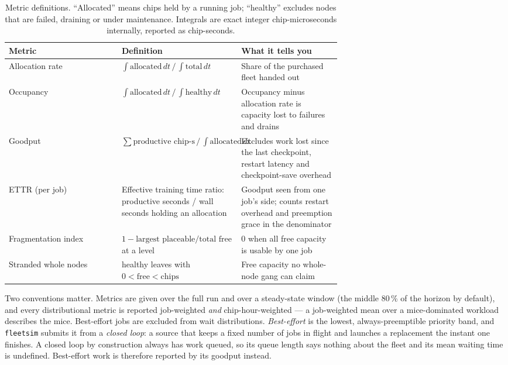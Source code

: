 \begin{table}[t]
\centering
\caption{Metric definitions. ``Allocated'' means chips held by a running job;
``healthy'' excludes nodes that are failed, draining or under maintenance.
Integrals are exact integer chip-microseconds internally, reported as
chip-seconds.}
\label{tab:metrics}
\small
\begin{tabular}{@{}lp{0.36\linewidth}p{0.30\linewidth}@{}}
\toprule
Metric & Definition & What it tells you \\
\midrule
Allocation rate & $\int \text{allocated}\,dt \,/\, \int \text{total}\,dt$ &
Share of the purchased fleet handed out \\
Occupancy & $\int \text{allocated}\,dt \,/\, \int \text{healthy}\,dt$ &
Occupancy minus allocation rate is capacity lost to failures and drains \\
Goodput & $\sum \text{productive chip-s} \,/\, \int \text{allocated}\,dt$ &
Excludes work lost since the last checkpoint, restart latency and
checkpoint-save overhead \\
ETTR (per job) & Effective training time ratio: productive seconds / wall
seconds holding an allocation &
Goodput seen from one job's side; counts restart overhead and preemption grace
in the denominator \\
Fragmentation index & $1 - \text{largest placeable} / \text{total free}$ at a
level & $0$ when all free capacity is usable by one job \\
Stranded whole nodes & healthy leaves with $0 < \text{free} < \text{chips}$ &
Free capacity no whole-node gang can claim \\
\bottomrule
\end{tabular}
\end{table}

Two conventions matter. Metrics are given over the full run and over a
steady-state window (the middle 80\,\% of the horizon by default), and every
distributional metric is reported job-weighted \emph{and} chip-hour-weighted ---
a job-weighted mean over a mice-dominated workload describes the mice.
Best-effort jobs are excluded from wait distributions. \emph{Best-effort} is the
lowest, always-preemptible priority band, and \texttt{fleetsim} submits it from
a \emph{closed loop}: a source that keeps a fixed number of jobs in flight and
launches a replacement the instant one finishes. A closed loop by construction
always has work queued, so its queue length says nothing about the fleet and its
mean waiting time is undefined. Best-effort work is therefore reported by its
goodput instead.
